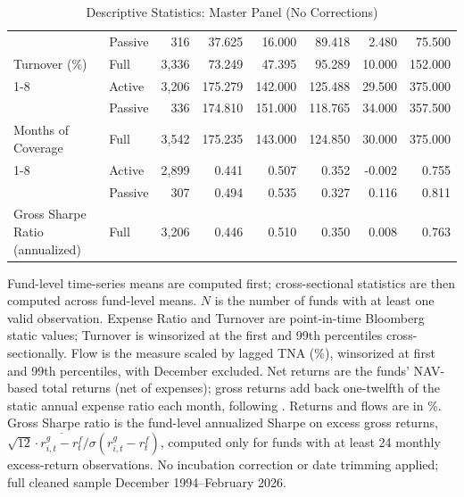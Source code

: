 \begin{table}[!htbp]
{\begin{tabular}[t]{llrrrrrr}
 & Passive & 316 & 37.625 & 16.000 & 89.418 & 2.480 & 75.500\\

\multirow{-3}{*}{\raggedright\arraybackslash Turnover (\%)} & Full & 3,336 & 73.249 & 47.395 & 95.289 & 10.000 & 152.000\\
\cmidrule{1-8}
 & Active & 3,206 & 175.279 & 142.000 & 125.488 & 29.500 & 375.000\\

 & Passive & 336 & 174.810 & 151.000 & 118.765 & 34.000 & 357.500\\

\multirow{-3}{*}{\raggedright\arraybackslash Months of Coverage} & Full & 3,542 & 175.235 & 143.000 & 124.850 & 30.000 & 375.000\\
\cmidrule{1-8}
 & Active & 2,899 & 0.441 & 0.507 & 0.352 & -0.002 & 0.755\\

 & Passive & 307 & 0.494 & 0.535 & 0.327 & 0.116 & 0.811\\

\multirow{-3}{*}{\raggedright\arraybackslash Gross Sharpe Ratio (annualized)} & Full & 3,206 & 0.446 & 0.510 & 0.350 & 0.008 & 0.763\\
\bottomrule
\end{tabular}%
}\sbefit
\setlength{\tabletempwidth}{\wd\tabletempbox}
\ifdim\tabletempwidth>\linewidth\setlength{\tabletempwidth}{\linewidth}\fi
\begin{minipage}{\tabletempwidth}
\captionsetup{width=\linewidth}
\caption{\label{tab:desc_stats_master}Descriptive Statistics: Master Panel (No Corrections)}
\ifdim\wd\tabletempbox>\linewidth
  \resizebox{\linewidth}{!}{\usebox{\tabletempbox}}
\else
  \usebox{\tabletempbox}
\fi
\par\medskip
\begin{singlespace}\tablefont\noindent
Fund-level time-series means are computed first; cross-sectional statistics are then computed across fund-level means. $N$ is the number of funds with at least one valid observation. Expense Ratio and Turnover are point-in-time Bloomberg static values; Turnover is winsorized at the first and 99th percentiles cross-sectionally. Flow is the \textcite{SirriTufano1998} measure scaled by lagged TNA (\%), winsorized at first and 99th percentiles, with December excluded. Net returns are the funds' NAV-based total returns (net of expenses); gross returns add back one-twelfth of the static annual expense ratio each month, following \textcite{FamaFrench2010}. Returns and flows are in \%. Gross Sharpe ratio is the fund-level annualized Sharpe on excess gross returns, $\sqrt{12}\cdot\overline{r^{g}_{i,t}-r^{f}_{t}}/\sigma(r^{g}_{i,t}-r^{f}_{t})$, computed only for funds with at least 24 monthly excess-return observations. No incubation correction or date trimming applied; full cleaned sample December 1994--February 2026.
\end{singlespace}
\end{minipage}
\end{table}


